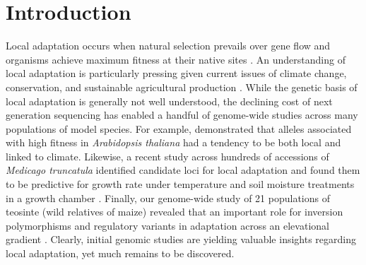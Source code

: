 
\begin{center}
\end{center}
%
%

\section*{Introduction}

Local adaptation occurs when natural selection prevails over gene flow and organisms achieve maximum fitness at their native sites \citep{Kawecki2004}. An understanding of local adaptation is particularly pressing given current issues of climate change, conservation, and sustainable agricultural production \citep{savolainen2013ecological}.   While the genetic basis of local adaptation is generally not well understood, the declining cost of next generation sequencing has enabled a handful of genome-wide studies across many populations of model species.  For example, \citet{fournier2011map} demonstrated that alleles associated with high fitness in \emph{Arabidopsis thaliana} had a tendency to be both local and linked to climate.  Likewise, a recent study across hundreds of accessions of \emph{Medicago truncatula} identified candidate loci for local adaptation and found them to be predictive for growth rate under temperature and soil moisture treatments in a growth chamber \citep{Yoder17012014}.  Finally, our genome-wide study of 21 populations of teosinte (wild relatives of maize) revealed that an important role for inversion polymorphisms and regulatory variants in adaptation across an elevational gradient \citep{Pyhajarvi2013}.  Clearly, initial genomic studies are yielding valuable insights regarding local adaptation, yet much remains to be discovered.

